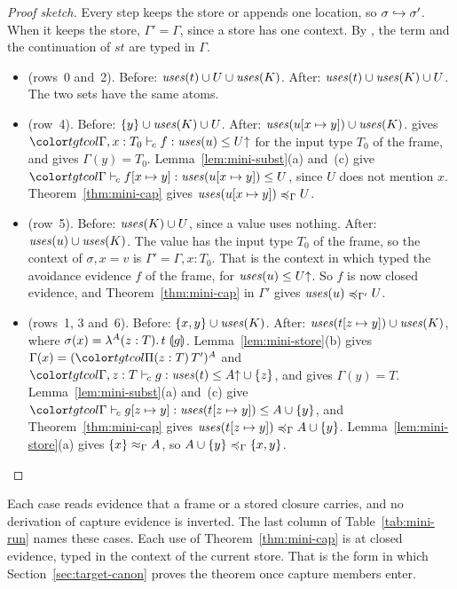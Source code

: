 \begin{proof}[Proof sketch]
Every step keeps the store or appends one location, so $\sext{\sigma}{\sigma'}$. When it keeps the store, $\Gamma' = \Gamma$, since a store has one context. By , the term and the continuation of $\mathit{st}$ are typed in $\Gamma$.
\begin{itemize}
\item {} (rows~0 and~2). Before: $\uses{t} \cup U \cup \uses{K}$. After: $\uses{t} \cup \uses{K} \cup U$. The two sets have the same atoms.
\item {} (row~4). Before: $\cset{y} \cup \uses{K} \cup U$. After: $\uses{u[x \mapsto y]} \cup \uses{K}$.  gives $\clej{\Gamma, x : T_0}{f}{\uses{u}}{\weak{U}}$ for the input type $T_0$ of the frame, and  gives $\Gamma(y) = T_0$. Lemma~\ref{lem:mini-subst}(a) and~(c) give $\clej{\Gamma}{f[x \mapsto y]}{\uses{u[x \mapsto y]}}{U}$, since $U$ does not mention $x$. Theorem~\ref{thm:mini-cap} gives $\caple{\Gamma}{\uses{u[x \mapsto y]}}{U}$.
\item {} (row~5). Before: $\uses{K} \cup U$, since a value uses nothing. After: $\uses{u} \cup \uses{K}$. The value has the input type $T_0$ of the frame, so the context of $\sigma, x = v$ is $\Gamma' = \Gamma, x : T_0$. That is the context in which  typed the avoidance evidence $f$ of the frame, for $\uses{u} \le \weak{U}$. So $f$ is now closed evidence, and Theorem~\ref{thm:mini-cap} in $\Gamma'$ gives $\caple{\Gamma'}{\uses{u}}{U}$.
\item {} (rows~1, 3 and~6). Before: $\cset{x, y} \cup \uses{K}$. After: $\uses{t[z \mapsto y]} \cup \uses{K}$, where $\sigma(x) = \lamc{A}{z}{T}{t}{g}$. Lemma~\ref{lem:mini-store}(b) gives $\Gamma(x) = \capt{(\pit[z]{T}{T'})}{A}$ and $\clej{\Gamma, z : T}{g}{\uses{t}}{\weak{A} \cup \cset{z}}$, and  gives $\Gamma(y) = T$. Lemma~\ref{lem:mini-subst}(a) and~(c) give $\clej{\Gamma}{g[z \mapsto y]}{\uses{t[z \mapsto y]}}{A \cup \cset{y}}$, and Theorem~\ref{thm:mini-cap} gives $\caple{\Gamma}{\uses{t[z \mapsto y]}}{A \cup \cset{y}}$. Lemma~\ref{lem:mini-store}(a) gives $\capeqv{\Gamma}{\cset{x}}{A}$, so $\caple{\Gamma}{A \cup \cset{y}}{\cset{x, y}}$. \qedhere
\end{itemize}
\end{proof}

Each case reads evidence that a frame or a stored closure carries, and no derivation of capture evidence is inverted. The last column of Table~\ref{tab:mini-run} names these cases. Each use of Theorem~\ref{thm:mini-cap} is at closed evidence, typed in the context of the current store. That is the form in which Section~\ref{sec:target-canon} proves the theorem once capture members enter.

